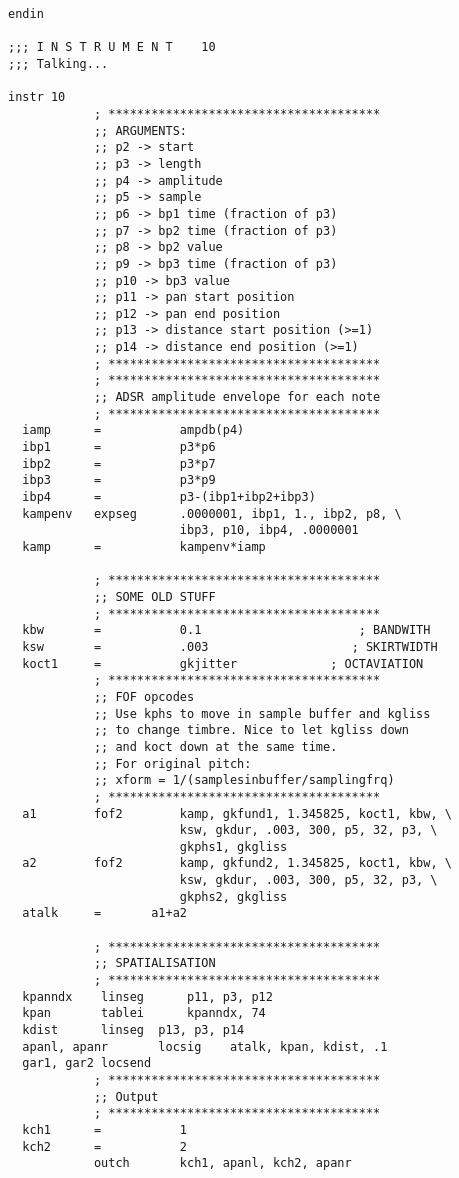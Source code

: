 \begin{verbatim}
endin

;;; I N S T R U M E N T    10
;;; Talking...

instr 10
            ; **************************************
        	;; ARGUMENTS:
            ;; p2 -> start
            ;; p3 -> length
            ;; p4 -> amplitude
            ;; p5 -> sample
            ;; p6 -> bp1 time (fraction of p3)
            ;; p7 -> bp2 time (fraction of p3)
            ;; p8 -> bp2 value
            ;; p9 -> bp3 time (fraction of p3)
            ;; p10 -> bp3 value
     	    ;; p11 -> pan start position
    	    ;; p12 -> pan end position
	        ;; p13 -> distance start position (>=1)
    	    ;; p14 -> distance end position (>=1)
            ; **************************************
            ; **************************************
            ;; ADSR amplitude envelope for each note
            ; **************************************
  iamp      =           ampdb(p4)
  ibp1      =           p3*p6
  ibp2      =           p3*p7
  ibp3      =           p3*p9
  ibp4      =           p3-(ibp1+ibp2+ibp3)
  kampenv   expseg      .0000001, ibp1, 1., ibp2, p8, \
                        ibp3, p10, ibp4, .0000001
  kamp      =           kampenv*iamp

            ; **************************************
            ;; SOME OLD STUFF
            ; **************************************
  kbw       =           0.1                      ; BANDWITH
  ksw       =           .003                    ; SKIRTWIDTH
  koct1     =           gkjitter             ; OCTAVIATION
            ; **************************************
            ;; FOF opcodes
            ;; Use kphs to move in sample buffer and kgliss 
            ;; to change timbre. Nice to let kgliss down
            ;; and koct down at the same time.
            ;; For original pitch: 
            ;; xform = 1/(samplesinbuffer/samplingfrq)
            ; **************************************
  a1        fof2        kamp, gkfund1, 1.345825, koct1, kbw, \
                        ksw, gkdur, .003, 300, p5, 32, p3, \
                        gkphs1, gkgliss
  a2        fof2        kamp, gkfund2, 1.345825, koct1, kbw, \
                        ksw, gkdur, .003, 300, p5, 32, p3, \
                        gkphs2, gkgliss
  atalk	    =		a1+a2

            ; **************************************
            ;; SPATIALISATION
            ; **************************************
  kpanndx    linseg      p11, p3, p12
  kpan       tablei      kpanndx, 74
  kdist	     linseg	 p13, p3, p14
  apanl, apanr		 locsig	   atalk, kpan, kdist, .1
  gar1, gar2 locsend
            ; **************************************
            ;; Output
            ; **************************************
  kch1      =           1
  kch2      =           2
            outch       kch1, apanl, kch2, apanr


\end{verbatim}
